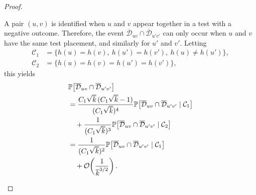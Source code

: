 \documentclass[journal]{IEEEtran}
\theoremstyle{definition}
\theoremstyle{definition}
\newcommand{\PP}{\mathbb{P}}
\newcommand{\kb}{\overline{k}}
\newcommand{\bigO}{\mathcal{O}}
\newcommand{\barD}{\overline{\mathcal{D}}}
\begin{document}
\begin{proof}
\begin{enumerate}
A pair $(u,v)$ is identified when $u$ and $v$ appear together in a test 
with a negative outcome. Therefore, the event $\barD_{uv} \cap \barD_{u'v'}$ 
can only occur when $u$ and $v$ have the same test placement, and similarly 
for $u'$ and $v'$. Letting
\begin{align*}
    \mathcal{C}_1 &= \bigl\{h(u) = h(v),\ h(u') = h(v'),\ h(u) \neq h(u')\bigr\}, \\
    \mathcal{C}_2 &= \bigl\{h(u) = h(v) = h(u') = h(v')\bigr\},
\end{align*}
this yields
\begin{align}
    &\PP\bigl[\barD_{uv} \cap \barD_{u'v'}\bigr] \\
    &= \frac{C_1 \sqrt{\kb}\,(C_1 \sqrt{\kb} - 1)}{(C_1\sqrt{\kb})^{4}} 
       \PP\bigl[\barD_{uv} \cap \barD_{u'v'} \mid \mathcal{C}_1\bigr] \notag \\
    &\quad + \frac{1}{(C_1 \sqrt{\kb})^3} 
       \PP\bigl[\barD_{uv} \cap \barD_{u'v'} \mid \mathcal{C}_2\bigr] \notag \\
    &= \frac{1}{(C_1 \sqrt{\kb})^2}
       \PP\bigl[\barD_{uv} \cap \barD_{u'v'} \mid \mathcal{C}_1\bigr] \notag \\
    &\quad + \bigO\!\left(\frac{1}{\kb^{3/2}}\right).
    \label{eq:lem_cova_Dc_uv_cap}
\end{align}
		

\end{enumerate}
\end{proof}
\end{document}
